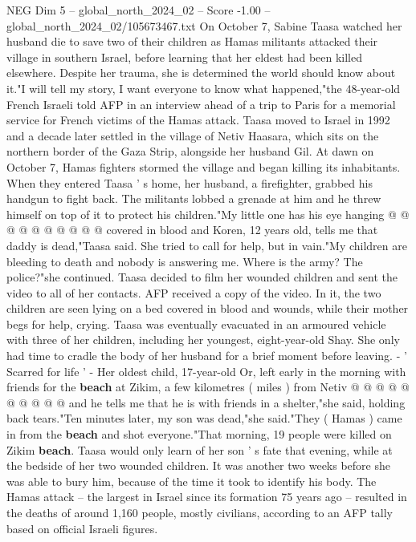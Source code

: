 \begin{textsample}{NEG Dim 5 – global\_north\_2024\_02 – Score -1.00 – global\_north\_2024\_02/105673467.txt}  \label{ex:f5_neg_215}
On October 7, Sabine Taasa watched her husband die to save two of their children as Hamas militants attacked their village in southern Israel, before learning that her eldest had been killed elsewhere.
Despite her trauma, she is determined the world should know about it."I will tell my story, I want everyone to know what happened,"the 48-year-old French Israeli told AFP in an interview ahead of a trip to Paris for a memorial service for French victims of the Hamas attack.
Taasa moved to Israel in 1992 and a decade later settled in the village of Netiv Haasara, which sits on the northern border of the Gaza Strip, alongside her husband Gil.
At dawn on October 7, Hamas fighters stormed the village and began killing its inhabitants.
When they entered Taasa ' s home, her husband, a firefighter, grabbed his handgun to fight back.
The militants lobbed a grenade at him and he threw himself on top of it to protect his children."My little one has his eye hanging @ @ @ @ @ @ @ @ @ @ covered in blood and Koren, 12 years old, tells me that daddy is dead,"Taasa said.
She tried to call for help, but in vain."My children are bleeding to death and nobody is answering me.
Where is the army?
The police?"she continued.
Taasa decided to film her wounded children and sent the video to all of her contacts.
AFP received a copy of the video.
In it, the two children are seen lying on a bed covered in blood and wounds, while their mother begs for help, crying.
Taasa was eventually evacuated in an armoured vehicle with three of her children, including her youngest, eight-year-old Shay.
She only had time to cradle the body of her husband for a brief moment before leaving. - ' Scarred for life ' - Her oldest child, 17-year-old Or, left early in the morning with friends for the \textbf{beach} at Zikim, a few kilometres ( miles ) from Netiv @ @ @ @ @ @ @ @ @ @ and he tells me that he is with friends in a shelter,"she said, holding back tears."Ten minutes later, my son was dead,"she said."They ( Hamas ) came in from the \textbf{beach} and shot everyone."That morning, 19 people were killed on Zikim \textbf{beach}.
Taasa would only learn of her son ' s fate that evening, while at the bedside of her two wounded children.
It was another two weeks before she was able to bury him, because of the time it took to identify his body.
The Hamas attack -- the largest in Israel since its formation 75 years ago -- resulted in the deaths of around 1,160 people, mostly civilians, according to an AFP tally based on official Israeli figures.

\end{textsample}
